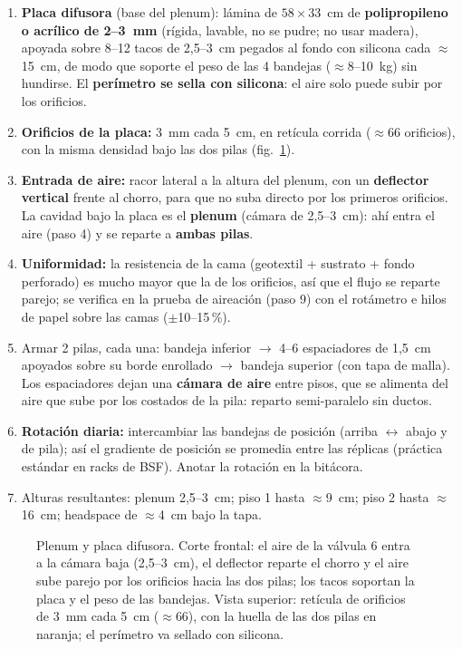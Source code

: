 \documentclass[11pt,a4paper]{article}
\begin{document}
\begin{enumerate}
  \item \textbf{Placa difusora} (base del plenum): lámina de
        $58\times33$~cm de \textbf{polipropileno o acrílico de 2--3~mm}
        (rígida, lavable, no se pudre; no usar madera), apoyada sobre
        8--12 tacos de 2,5--3~cm pegados al fondo con silicona cada
        ${\approx}$15~cm, de modo que soporte el peso de las 4 bandejas
        (${\approx}$8--10~kg) sin hundirse. El \textbf{perímetro se sella
        con silicona}: el aire solo puede subir por los orificios.
  \item \textbf{Orificios de la placa:} 3~mm cada 5~cm, en retícula
        corrida (${\approx}$66 orificios), con la misma densidad bajo las
        dos pilas (fig.~\ref{fig:plenum}).
  \item \textbf{Entrada de aire:} racor lateral a la altura del plenum,
        con un \textbf{deflector vertical} frente al chorro, para que no
        suba directo por los primeros orificios. La cavidad bajo la placa
        es el \textbf{plenum} (cámara de 2,5--3~cm): ahí entra el aire
        (paso 4) y se reparte a \textbf{ambas pilas}.
  \item \textbf{Uniformidad:} la resistencia de la cama (geotextil +
        sustrato + fondo perforado) es mucho mayor que la de los
        orificios, así que el flujo se reparte parejo; se verifica en la
        prueba de aireación (paso 9) con el rotámetro e hilos de papel
        sobre las camas ($\pm$10--15\,\%).
  \item Armar 2 pilas, cada una: bandeja inferior $\rightarrow$ 4--6
        espaciadores de 1,5~cm apoyados sobre su borde enrollado
        $\rightarrow$ bandeja superior (con tapa de malla). Los espaciadores
        dejan una \textbf{cámara de aire} entre pisos, que se alimenta del
        aire que sube por los costados de la pila: reparto semi-paralelo sin
        ductos.
  \item \textbf{Rotación diaria:} intercambiar las bandejas de posición
        (arriba $\leftrightarrow$ abajo y de pila); así el gradiente de
        posición se promedia entre las réplicas (práctica estándar en racks
        de BSF). Anotar la rotación en la bitácora.
  \item Alturas resultantes: plenum 2,5--3~cm; piso 1 hasta ${\approx}$9~cm;
        piso 2 hasta ${\approx}$16~cm; headspace de ${\approx}$4~cm bajo la
        tapa.
\end{enumerate}

\begin{figure}[h!]
\centering
\resizebox{0.98\textwidth}{!}{}
\caption{Plenum y placa difusora. Corte frontal: el aire de la válvula 6 entra a la cámara baja (2,5--3~cm), el deflector reparte el chorro y el aire sube parejo por los orificios hacia las dos pilas; los tacos soportan la placa y el peso de las bandejas. Vista superior: retícula de orificios de 3~mm cada 5~cm (${\approx}$66), con la huella de las dos pilas en naranja; el perímetro va sellado con silicona.}
\label{fig:plenum}
\end{figure}
\end{document}

